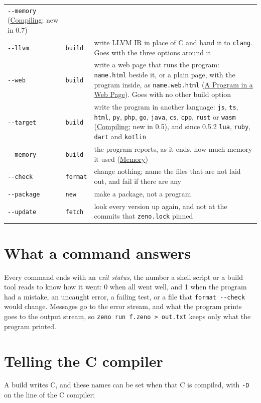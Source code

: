 \begin{longtable}{llP{6.6cm}}
  \verb|--memory| (\hyperref[ch-compiling]{Compiling}; new in
  0.7) \\
\verb|--llvm| & \verb|build| & write LLVM IR in place of C and hand it
  to \verb|clang|. Goes with the three options around it \\
\verb|--web| & \verb|build| & write a web page that runs the program:
  \verb|name.html| beside it, or a plain page, with the program inside,
  as \verb|name.web.html| (\hyperref[ch-web]{A Program in a Web
  Page}). Goes with no other build option \\
\verb|--target| & \verb|build| & write the program in another language: \verb|js|, \verb|ts|, \verb|html|, \verb|py|, \verb|php|, \verb|go|, \verb|java|, \verb|cs|, \verb|cpp|, \verb|rust| or \verb|wasm| (\hyperref[ch-compiling]{Compiling}; new in 0.5), and since 0.5.2 \verb|lua|, \verb|ruby|, \verb|dart| and \verb|kotlin| \\
\verb|--memory| & \verb|build| & the program reports, as it ends, how
  much memory it used (\hyperref[ch-memory]{Memory}) \\
\verb|--check| & \verb|format| & change nothing; name the files that are
  not laid out, and fail if there are any \\
\verb|--package| & \verb|new| & make a package, not a program \\
\verb|--update| & \verb|fetch| & look every version up again, and not at
  the commits that \verb|zeno.lock| pinned \\
\bottomrule
\end{longtable}

\section{What a command answers}

Every command ends with an \emph{exit status}, the number a shell
script or a build tool reads to know how it went: 0 when all went
well, and 1 when the program had a mistake, an uncaught error, a
failing test, or a file that \verb|format --check| would change.
Messages go to the error stream, and what the program prints goes to
the output stream, so \verb|zeno run f.zeno > out.txt| keeps only what
the program printed.

\section{Telling the C compiler}

A build writes C, and these names can be set when that C is compiled,
with \verb|-D| on the line of the C compiler:

